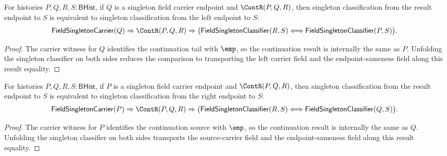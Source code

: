 \begin{theorem}
\label{thm:field-singleton-classifier-continuation-left-endpoint-transport}
For histories $P,Q,R,S:\mathsf{BHist}$, if $Q$ is a singleton field carrier
endpoint and $\ContR(P,Q,R)$, then singleton classification from the result
endpoint to $S$ is equivalent to singleton classification from the left
endpoint to $S$:
$$
\mathsf{FieldSingletonCarrier}(Q)\Rightarrow
\ContR(P,Q,R)\Rightarrow
\bigl(\mathsf{FieldSingletonClassifier}(R,S)\Longleftrightarrow
\mathsf{FieldSingletonClassifier}(P,S)\bigr).
$$
\end{theorem}
\begin{proof}
The carrier witness for $Q$ identifies the continuation tail with $\emp$, so
the continuation result is internally the same as $P$. Unfolding the singleton
classifier on both sides reduces the comparison to transporting the left
carrier field and the endpoint-sameness field along this result equality.
\end{proof}

\begin{theorem}
\label{thm:field-singleton-classifier-continuation-right-endpoint-transport}
For histories $P,Q,R,S:\mathsf{BHist}$, if $P$ is a singleton field carrier
endpoint and $\ContR(P,Q,R)$, then singleton classification from the result
endpoint to $S$ is equivalent to singleton classification from the right
endpoint to $S$:
$$
\mathsf{FieldSingletonCarrier}(P)\Rightarrow
\ContR(P,Q,R)\Rightarrow
\bigl(\mathsf{FieldSingletonClassifier}(R,S)\Longleftrightarrow
\mathsf{FieldSingletonClassifier}(Q,S)\bigr).
$$
\end{theorem}
\begin{proof}
The carrier witness for $P$ identifies the continuation source with $\emp$,
so the continuation result is internally the same as $Q$. Unfolding the
singleton classifier on both sides transports the source-carrier field and the
endpoint-sameness field along this result equality.
\end{proof}

